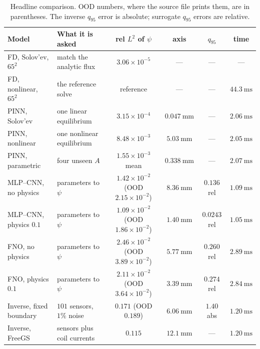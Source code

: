 \documentclass[11pt,a4paper,oneside,openany]{book}
\numberwithin{equation}{chapter}
\theoremstyle{definition}
\begin{document}
\begin{table}[htbp]
\centering
\caption{Headline comparison. OOD numbers, where the source file prints them, are in parentheses. The inverse \(q_{95}\) error is absolute; surrogate \(q_{95}\) errors are relative.}
\label{tab:headline}
\footnotesize
\setlength{\tabcolsep}{3.6pt}
\begin{tabularx}{\textwidth}{@{}>{\raggedright\arraybackslash}p{2.55cm} >{\raggedright\arraybackslash}Y c c c c@{}}
\toprule
Model & What it is asked & rel \(L^{2}\) of \(\psi\) & axis & \(q_{95}\) & time \\
\midrule
FD, Solov'ev, \(65^{2}\) & match the analytic flux & \(3.06\times 10^{-5}\) & --- & --- & --- \\
FD, nonlinear, \(65^{2}\) & the reference solve & reference & --- & --- & \(\qty{44.3}{\milli\second}\) \\
PINN, Solov'ev & one linear equilibrium & \(3.15\times 10^{-4}\) & \(\qty{0.047}{\milli\metre}\) & --- & \(\qty{2.06}{\milli\second}\) \\
PINN, nonlinear & one nonlinear equilibrium & \(8.48\times 10^{-3}\) & \(\qty{5.03}{\milli\metre}\) & --- & \(\qty{2.05}{\milli\second}\) \\
PINN, parametric & four unseen \(A\) & \(1.55\times 10^{-3}\) mean & \(\qty{0.338}{\milli\metre}\) & --- & \(\qty{2.07}{\milli\second}\) \\
MLP--CNN, no physics & parameters to \(\psi\) & \(1.42\times 10^{-2}\) {\scriptsize(OOD \(2.15\times 10^{-2}\))} & \(\qty{8.36}{\milli\metre}\) & \(0.136\) rel & \(\qty{1.09}{\milli\second}\) \\
MLP--CNN, physics \(0.1\) & parameters to \(\psi\) & \(1.09\times 10^{-2}\) {\scriptsize(OOD \(1.86\times 10^{-2}\))} & \(\qty{1.40}{\milli\metre}\) & \(0.0243\) rel & \(\qty{1.05}{\milli\second}\) \\
FNO, no physics & parameters to \(\psi\) & \(2.46\times 10^{-2}\) {\scriptsize(OOD \(3.89\times 10^{-2}\))} & \(\qty{5.77}{\milli\metre}\) & \(0.260\) rel & \(\qty{2.89}{\milli\second}\) \\
FNO, physics \(0.1\) & parameters to \(\psi\) & \(2.11\times 10^{-2}\) {\scriptsize(OOD \(3.64\times 10^{-2}\))} & \(\qty{3.39}{\milli\metre}\) & \(0.274\) rel & \(\qty{2.84}{\milli\second}\) \\
Inverse, fixed boundary & \(101\) sensors, \(1\%\) noise & \(0.171\) {\scriptsize(OOD \(0.189\))} & \(\qty{6.06}{\milli\metre}\) & \(1.40\) abs & \(\qty{1.20}{\milli\second}\) \\
Inverse, FreeGS & sensors plus coil currents & \(0.115\) & \(\qty{12.1}{\milli\metre}\) & --- & \(\qty{1.20}{\milli\second}\) \\
\bottomrule
\end{tabularx}
\end{table}
\end{document}
